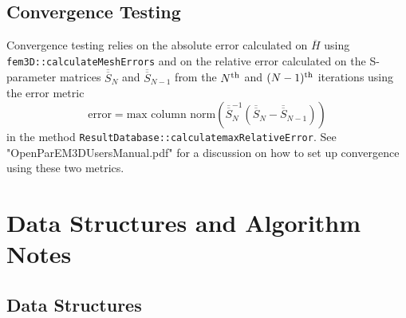 \documentclass[titlepage]{article}
\renewcommand\_{\textunderscore\linebreak[1]}
\begin{document}
\subsection{Convergence Testing}

Convergence testing relies on the absolute error calculated on $\overline{H}$ using \texttt{fem3D::calculateMeshErrors} and on the relative error calculated on the S-parameter matrices $\overline{\overline{S}}_N$ and $\overline{\overline{S}}_{N-1}$ from the $N^{\textnormal{th}}$ and $(N-1)^{\textnormal{th}}$ iterations using the error metric
\begin{equation}
\text{error}=\text{max column norm} \left( \overline{\overline{S}}_N^{-1} \left(\overline{\overline{S}}_N-\overline{\overline{S}}_{N-1} \right) \right)
\end{equation}
in the method \texttt{ResultDatabase::calculate\_maxRelativeError}.  See "OpenParEM3D\_Users\_Manual.pdf" for a discussion on how to set up convergence using these two metrics.

\section{Data Structures and Algorithm Notes}

\subsection{Data Structures}
\end{document}
